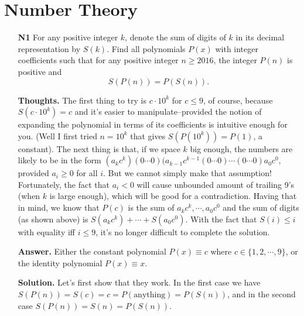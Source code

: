 \documentclass[11pt,a4paper]{article}
\begin{document}
\newpage 
\section{Number Theory}
\begin{itemize}
\item[\textbf{N1}]
For any positive integer $k$, denote the sum of digits of $k$ in its decimal representation by $S(k)$. Find all polynomials $P(x)$ with integer coefficients such that for any positive integer $n \geq 2016$, the integer $P(n)$ is positive and $$S(P(n)) = P(S(n)).$$

\textbf{Thoughts.} 
The first thing to try is $c\cdot 10^k$ for $c\le 9$, of course, 
because $S(c\cdot 10^k)=c$ and it's easier to manipulate--provided the notion of expanding the polynomial in terms of its coefficients is intuitive enough for you. 
(Well I first tried $n=10^k$ that gives $S(P(10^k))=P(1)$, a constant). 
The next thing is that, if we space $k$ big enough, the numbers are likely to be in the form 
$(a_kc^k)(0\cdots 0)(a_{k-1}c^{k-1}(0\cdots 0)\cdots (0\cdots 0)a_0c^0$, 
provided $a_i\ge 0$ for all $i$. 
But we cannot simply make that assumption! 
Fortunately, the fact that $a_i< 0$ will cause unbounded amount of trailing 9's (when $k$ is large enough), which will be good for a contradiction. 
Having that in mind, we know that $P(c)$ is the sum of $a_kc^k, \cdots , a_0c^0$ and the sum of digits (as shown above) is 
$S(a_kc^k)+\cdots +S(a_0c^0)$. 
With the fact that $S(i)\le i$ with equality iff $i\le 9$, it's no longer difficult to complete the solution. 

\textbf{Answer.} Either the constant polynomial $P(x)\equiv c$ where $c\in\{1,2,\cdots ,9\}$, or the identity polynomial $P(x)\equiv x$.

\textbf{Solution.} 
Let's first show that they work. In the first case we have $S(P(n))=S(c)=c=P(\text{anything})=P(S(n))$, 
and in the second case $S(P(n))=S(n)=P(S(n))$. 


\end{itemize}
\end{document}
